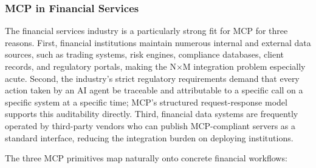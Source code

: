 \documentclass{article}
\begin{document}
\subsubsection{MCP in Financial Services}
The financial services industry is a particularly strong fit for MCP for three reasons. First, financial institutions maintain numerous internal and external data sources, such as trading systems, risk engines, compliance databases, client records, and regulatory portals, making the N$\times$M integration problem especially acute. Second, the industry's strict regulatory requirements demand that every action taken by an AI agent be traceable and attributable to a specific call on a specific system at a specific time; MCP's structured request-response model supports this auditability directly. Third, financial data systems are frequently operated by third-party vendors who can publish MCP-compliant servers as a standard interface, reducing the integration burden on deploying institutions.

The three MCP primitives map naturally onto concrete financial workflows:
\end{document}
